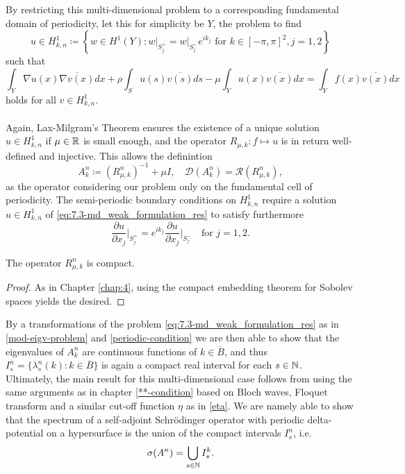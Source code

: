 By restricting this multi-dimensional problem to a corresponding fundamental domain of periodicity, let this for simplicity be $Y$, the problem to find 
	\[ u \in H^{1}_{k, n} \coloneqq \left\{ w \in H^{1}(Y) \colon w \big|_{S_{j}^{+}} = w \big|_{S_{j}^{-}} e^{i k_{j}} \text{ for } k \in [-\pi, \pi]^{2}, j = 1,2 \right\} \] %
such that
	\begin{equation}
		\int_{Y} \nabla u(x) \overline{\nabla v(x)} dx + \rho \int_{S} u(s) \overline{v(s)} ds - \mu \int_{Y} u(x) \overline{v(x)} dx = \int_{Y} f(x) \overline{v(x)} dx \label{eq:7.3-md_weak_formulation_res}
	\end{equation} 
holds for all $v \in H^{1}_{k, n}$. 
~\\ ~\\
Again, Lax-Milgram's Theorem ensures the existence of a unique solution $u \in H^{1}_{k, n}$ if $\mu \in \mathbb{R}$ is small enough, and the operator $R_{\mu, k} \colon f \mapsto u$ is in return well-defined and injective. This allows the definintion 
	\[ A_{k}^{n} \coloneqq \left(R_{\mu, k}^{n}\right)^{-1} + \mu I, \quad \mathcal{D}(A_{k}^{n}) = \mathcal{R}(R_{\mu, k}^{n}), \]
as the operator considering our problem only on the fundamental cell of periodicity. The semi-periodic boundary conditions on $H^{1}_{k,n}$ require a solution $u \in H^{1}_{k, n}$ of \eqref{eq:7.3-md_weak_formulation_res} to satisfy furthermore
	\[ \frac{\partial u}{\partial x_{j}}\big|_{S_{j}^{+}} = e^{ik_{j}} \frac{\partial u}{\partial x_{j}}\big|_{S_{j}^{-}} \quad \text{for } j = 1, 2.  \]
	
\begin{theorem}
	The operator $R_{\mu, k}^{n}$ is compact.	

	\begin{proof}
		As in Chapter \ref{chap:4}, using the compact embedding theorem for Sobolev spaces yields the desired. %
	\end{proof}
\end{theorem}

By a transformations of the problem \eqref{eq:7.3-md_weak_formulation_res} as in \eqref{mod-eigv-problem} and \eqref{periodic-condition} we are then able to show that the eigenvalues of $A^{n}_{k}$ are continuous functions of $k \in \overline{B}$, and thus $I^{n}_{s} = \{ \lambda^{n}_{s}(k) : k \in \overline{B} \}$ is again a compact real interval for each $s \in \mathbb{N}$.  %
~\newline ~\newline
Ultimately, the main result for this multi-dimensional case follows from using the same arguments as in chapter \ref{**-condition} based on Bloch waves, Floquet transform and a similar cut-off function $\eta$ as in \eqref{eta}. We are namely able to show that the spectrum of a self-adjoint Schrödinger operator with periodic delta-potential on a hypersurface is the union of the  compact intervals $I^{n}_{s}$, i.e.
	\[ \sigma(A^{n}) = \bigcup_{s \in \mathbb{N}} I^{k}_{s}. \]